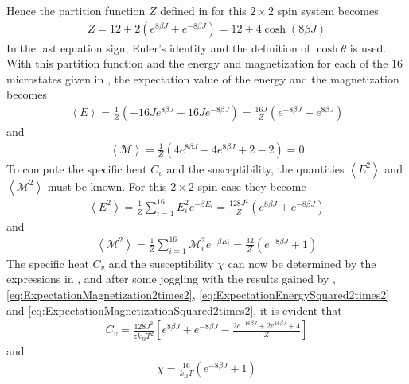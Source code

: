 Hence the partition function $Z$ defined in  for this $2\times 2$ spin system becomes
\begin{align}
	Z = 12 + 2\left( e^{8\beta J} + e^{-8 \beta J} \right)
	= 12 + 4\cosh (8\beta J)
	\label{eq:PartitionFunction2times2}
\end{align}
In the last equation sign, Euler's identity  and the definition of $\cosh \theta$ is used.
With this partition function and the energy and magnetization for each of the $16$ microstates given in , the expectation value of the energy and the magnetization becomes
\begin{align}
	\left< E \right> = \frac{1}{Z} (-16 J e^{8\beta J} + 16 J e^{-8\beta J} )
	 = \frac{16J}{Z} (e^{-8\beta J}-e^{8\beta J})
	 \label{eq:ExpectationEnergy2times2}
\end{align} 
and
\begin{align}
	\left< \mathcal{M} \right> = \frac{1}{Z} (4e^{8\beta J} -4e^{8\beta J} +2 -2 ) = 0 
	\label{eq:ExpectationMagnetization2times2}
\end{align}
To compute the specific heat $C_v$ and the susceptibility, the quantities $\left< E^2 \right>$ and $\left< \mathcal{M}^2 \right>$ must be known.
For this $2\times 2$ spin case they become
\begin{align}
	\left< E^2 \right> = \frac{1}{Z} \sum _{i=1} ^{16} E_i ^2 e^{-\beta E_i}
	= \frac{128 J^2}{Z} (e^{8\beta J} + e^{-8\beta J} ) 
	\label{eq:ExpectationEnergySquared2times2}
\end{align}
and 
\begin{align}
	\left< \mathcal{M}^2 \right> = \frac{1}{Z} \sum _{i=1} ^{16} \mathcal{M}_i ^2 e^{-\beta E_i}
	= \frac{32}{Z} (e^{-8\beta J} + 1 ) 
	\label{eq:ExpectationMagnetizationSquared2times2}
\end{align}
The specific heat $C_v$ and the susceptibility $\chi$ can now be determined by the expressions in , and after some joggling with the results gained by , \eqref{eq:ExpectationMagnetization2times2}, \eqref{eq:ExpectationEnergySquared2times2} and \eqref{eq:ExpectationMagnetizationSquared2times2}, it is evident that
\begin{align}
	C_v = \frac{128 J^2}{z k_B T^2} \left[ e^{8\beta J} + e^{-8\beta J} - \frac{2e^{-16\beta J}+2e^{16\beta J}+4}{Z} \right]
	\label{eq:SpecificHeat2times2}
\end{align}
and
\begin{align}
	\chi = \frac{16}{k_B T} (e^{-8\beta J} +1)
	\label{sec:Susceptibility2times2}
\end{align}